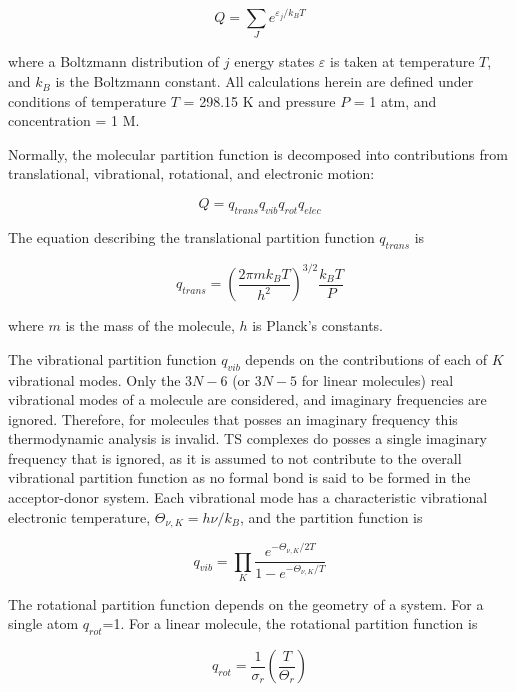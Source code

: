 \begin{doublespace}
\begin{equation}
  Q = \sum_J e^{\varepsilon_j/k_B T}
\end{equation}

\noindent where a Boltzmann distribution of $j$ energy states $\varepsilon$ is
taken at temperature $T$, and $k_B$ is the Boltzmann constant. All calculations
herein are defined under conditions of temperature $T$ = 298.15 K and pressure
$P$ = 1 atm, and concentration = 1 M.

Normally, the molecular partition function is decomposed into contributions
from translational, vibrational, rotational, and electronic motion:

\begin{equation}
  Q = q_{trans}q_{vib}q_{rot}q_{elec}
\end{equation}

\noindent The equation describing the translational partition function
$q_{trans}$ is

\begin{equation}
  q_{trans} = \left( \frac{2\pi m k_B T}{h^2} \right)^{3/2} \frac{k_B T}{P}
\end{equation}

\noindent where $m$ is the mass of the molecule, $h$ is Planck's constants.

The vibrational partition function $q_{vib}$ depends on the contributions of
each of $K$ vibrational modes. Only the $3N-6$ (or $3N-5$ for linear molecules)
real vibrational modes of a molecule are considered, and imaginary frequencies
are ignored. Therefore, for molecules that posses an imaginary frequency this
thermodynamic analysis is invalid. TS complexes do posses a single imaginary
frequency that is ignored, as it is assumed to not contribute to the overall
vibrational partition function as no formal bond is said to be formed in the
acceptor-donor system. Each vibrational mode has a characteristic vibrational
electronic temperature, $\Theta_{\nu,K} = h\nu/k_B$, and the partition function
is

\begin{equation}
  q_{vib} = \prod_K \frac{e^{-\Theta_{\nu,K}/2T}}{1 - e^{-\Theta_{\nu,K}/T}}
\end{equation}

The rotational partition function depends on the geometry of a system. For a
single atom $q_{rot}$=1. For a linear molecule, the rotational partition
function is

\begin{equation}
  q_{rot} = \frac{1}{\sigma_r} \left(\frac{T}{\Theta_r}\right)
\end{equation}


\end{doublespace}
